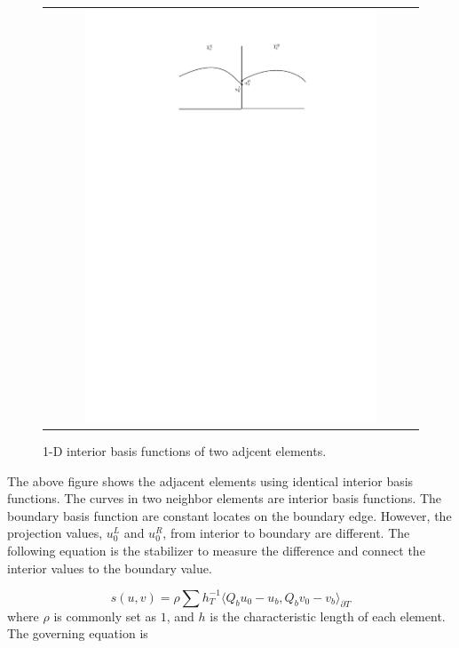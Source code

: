 \begin{figure}[h]
	\centering
	\begin{tabular}{c}
		\includegraphics[width=0.8\textwidth]{./pics/stabilizer.pdf}
	\end{tabular}
	\caption{\footnotesize 1-D interior basis functions of two adjcent elements.}\label{fig1: stabilierFig}
\end{figure}

The above figure shows the adjacent elements using identical interior basis functions. The curves in two neighbor elements are interior basis functions. The boundary basis function are constant locates on the boundary edge. However, the projection values, $ u_{0}^{L} $ and $ u_{0}^{R} $, from interior to boundary are different. The following equation is the stabilizer to measure the difference and connect the interior values to the boundary value.

\begin{equation}
s(u, v) = \rho \sum h_{T}^{-1} \langle Q_{b} u_{0} - u_{b}, Q_{b} v_{0} - v_{b} \rangle_{\partial T}
\end{equation}
where $ \rho $ is commonly set as $ 1 $, and $ h $ is the characteristic length of each element. The governing equation is 

